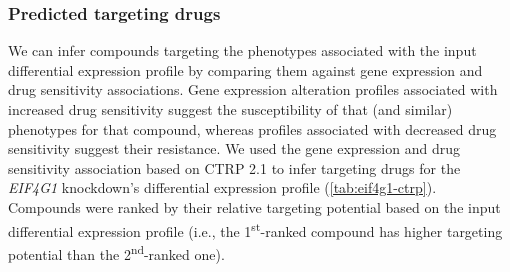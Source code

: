 \subsubsection{Predicted targeting drugs}

We can infer compounds targeting the phenotypes associated with the input differential expression profile by comparing them against gene expression and drug sensitivity associations. Gene expression alteration profiles associated with increased drug sensitivity suggest the susceptibility of that (and similar) phenotypes for that compound, whereas profiles associated with decreased drug sensitivity suggest their resistance. We used the gene expression and drug sensitivity association based on CTRP 2.1 to infer targeting drugs for the \emph{EIF4G1} knockdown's differential expression profile (\autoref{tab:eif4g1-ctrp}). Compounds were ranked by their relative targeting potential based on the input differential expression profile (i.e., the 1\textsuperscript{st}-ranked compound has higher targeting potential than the 2\textsuperscript{nd}-ranked one).

